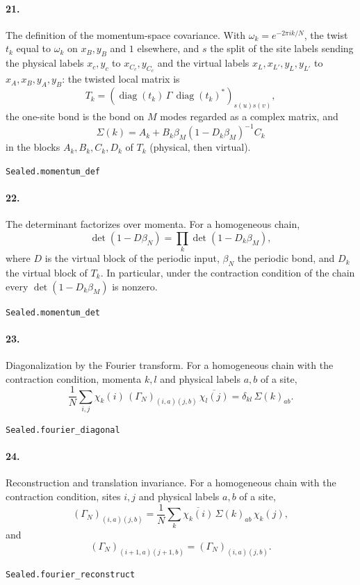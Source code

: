 \documentclass[11pt]{article}
\begin{document}
\paragraph{21.} The definition of the momentum-space covariance. With $\omega_k = e^{-2\pi i k / N}$, the twist $t_k$ equal to $\omega_k$ on $x_B, y_B$ and $1$ elsewhere, and $s$ the split of the site labels sending the physical labels $x_c, y_c$ to $x_{C_c}, y_{C_c}$ and the virtual labels $x_L, x_{L'}, y_L, y_{L'}$ to $x_A, x_B, y_A, y_B$: the twisted local matrix is \[T_k = (\operatorname{diag}(t_k)\, \Gamma\, \operatorname{diag}(t_k)^*)_{s(u) s(v)},\] the one-site bond is the bond on $M$ modes regarded as a complex matrix, and \[\Sigma(k) = A_k + B_k \beta_M (1 - D_k \beta_M)^{-1} C_k\] in the blocks $A_k, B_k, C_k, D_k$ of $T_k$ (physical, then virtual).\par{\footnotesize\texttt{Sealed.momentum\_def}}

\paragraph{22.} The determinant factorizes over momenta. For a homogeneous chain, \[\det(1 - D \beta_N) = \prod_k \det(1 - D_k \beta_M),\] where $D$ is the virtual block of the periodic input, $\beta_N$ the periodic bond, and $D_k$ the virtual block of $T_k$. In particular, under the contraction condition of the chain every $\det(1 - D_k \beta_M)$ is nonzero.\par{\footnotesize\texttt{Sealed.momentum\_det}}

\paragraph{23.} Diagonalization by the Fourier transform. For a homogeneous chain with the contraction condition, momenta $k, l$ and physical labels $a, b$ of a site, \[\frac1N \sum_{i,j} \chi_k(i)\, (\Gamma_N)_{(i,a)(j,b)}\, \overline{\chi_l(j)} = \delta_{kl}\, \Sigma(k)_{ab}.\]\par{\footnotesize\texttt{Sealed.fourier\_diagonal}}

\paragraph{24.} Reconstruction and translation invariance. For a homogeneous chain with the contraction condition, sites $i, j$ and physical labels $a, b$ of a site, \[(\Gamma_N)_{(i,a)(j,b)} = \frac1N \sum_k \overline{\chi_k(i)}\, \Sigma(k)_{ab}\, \chi_k(j),\] and \[(\Gamma_N)_{(i+1,a)(j+1,b)} = (\Gamma_N)_{(i,a)(j,b)}.\]\par{\footnotesize\texttt{Sealed.fourier\_reconstruct}}
\end{document}
